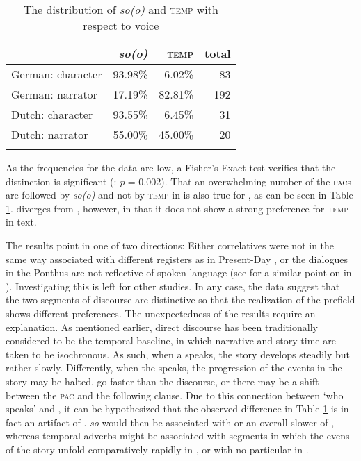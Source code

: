 \documentclass[output=paper,colorlinks,citecolor=brown]{langscibook}
\begin{document}
\begin{table}[ht]
\begin{tabularx}{0.6\textwidth}{Xrrr}
\lsptoprule
& {\textit{{so(o)}}} & {\textsc{{temp}}} & {total}	\\
\midrule
German: character& 93.98\% & 6.02\% & 83\\
German: narrator & 17.19\% & 82.81\% & 192 \\
\midrule
Dutch: character & 93.55\% & 6.45\% & 31\\
Dutch: narrator & 55.00\% & 45.00\% & 20\\
\lspbottomrule
\end{tabularx}
\caption{The distribution of \textit{so(o)} and \textsc{temp} with respect to voice}\label{tab-RE:WSP}
\end{table}

\noindent As the frequencies for the  data are low, a Fisher's Exact test verifies that the  distinction is significant (: \textit{p} = 0.002). That an overwhelming number of the \textsc{pac}s are followed by \textit{so(o)} and not by \textsc{temp} in  is also true for , as can be seen in Table \ref{tab-RE:WSP}.  diverges from , however, in that it does not show a strong preference for \textsc{temp} in  text. 

The results point in one of two directions: Either correlatives were not in the same way associated with different registers as in Present-Day , or the dialogues in the Ponthus are not reflective of spoken language (see for a similar point on  in  \citealt{Louviot2016}). Investigating this is left for other studies. In any case, the data suggest that the two segments of discourse are distinctive so that the realization of the prefield shows different preferences. The unexpectedness of the results require an explanation. As mentioned earlier, direct discourse has been traditionally considered to be the temporal baseline, in which narrative and story time are taken to be isochronous. As such, when a  speaks, the story develops steadily but rather slowly. Differently, when the  speaks, the progression of the events in the story may be halted, go faster than the discourse, or there may be a shift between the \textsc{pac} and the following clause. Due to this connection between `who speaks' and , it can be hypothesized that the observed difference in Table \ref{tab-RE:WSP} is in fact an artifact of . \textit{so} would then be associated with  or an overall slower  of , whereas temporal adverbs might be associated with segments in which the evens of the story unfold comparatively rapidly in , or with no particular  in .
\end{document}
